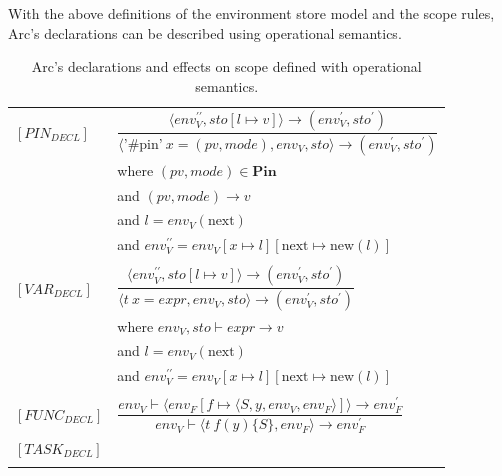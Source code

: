 With the above definitions of the environment store model and the scope rules, Arc's declarations can be described using operational semantics.


\begin{table}[htb!]
  \centering
  \begin{tabular}{ll}
    \toprule
    $[PIN_{DECL}]$  & $\dfrac
      {\langle env^{\prime\prime}_V, sto[l \mapsto v] \rangle \rightarrow (env^\prime_V, sto^\prime)}
      {\langle \text{'\#pin'} \ x = (pv, mode), env_V, sto\rangle\rightarrow (env^\prime_V, sto^\prime)}$ \\ [12pt]
                    & where $(pv, mode) \in \textbf{Pin} $                                                \\
                    & and $(pv,mode) \rightarrow v $                                                      \\
                    & and $l = env_V(\text{next})$                                                        \\
                    & and $env^{\prime\prime}_V = env_V[x \mapsto l][\text{next} \mapsto \text{new}(l)] $ \\
    \\

    $[VAR_{DECL}]$  & $\dfrac
      {\langle env^{\prime\prime}_V, sto[l \mapsto v] \rangle \rightarrow (env^\prime_V, sto^\prime)}
      {\langle t \ x = expr, env_V, sto\rangle\rightarrow (env^\prime_V, sto^\prime)}$                    \\ [12pt]
                    & where $env_V, sto \vdash expr \rightarrow v $                                       \\
                    & and $l = env_V(\text{next})$                                                        \\
                    & and $env^{\prime\prime}_V = env_V[x \mapsto l][\text{next} \mapsto \text{new}(l)] $ \\
    \\

    $[FUNC_{DECL}]$ & $\dfrac
      {env_V \vdash \langle env_F[f \mapsto \langle S, y, env_V, env_F\rangle] \rangle \rightarrow env^\prime_F}
      {env_V \vdash \langle t \ f (y) \{S \}, env_F \rangle \rightarrow env^\prime_F}$                    \\ [12pt]
    $[TASK_{DECL}]$ &                                                                                     \\
    \\


    \bottomrule
  \end{tabular}
  \caption{Arc's declarations and effects on scope defined with operational semantics.}
  \label{tab:arcscoperules}
\end{table}




